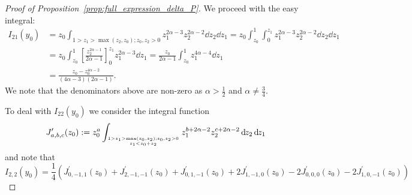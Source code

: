 \begin{proof}[Proof of Proposition~\ref{prop:full_expression_delta_P}]
We proceed with the easy integral:
\begin{align*}
	I_{21}(y_0) &= z_0 \int_{1>z_1>\max(z_2,z_0);z_0,z_2>0} z_1^{2\alpha-3} z_2^{2\alpha-2} {\dd}z_2{\dd}z_1   
		= z_0 \int_{z_0}^1 \int_{0}^{z_1} z_1^{2\alpha-3} z_2^{2\alpha-2} {\dd}z_2{\dd}z_1\\
	&= z_0 \int_{z_0}^1 \left[ \frac{z_2^{2\alpha-1}}{2\alpha-1}\right]_{0}^{z_1} z_1^{2\alpha-3} {\dd}z_1 
		= \frac{z_0}{2\alpha-1}  \int_{z_0}^1 z_1^{4\alpha-4} {\dd}z_1 \\
	&= \frac{z_0 - z_0^{4\alpha-2}}{(4\alpha-3)(2\alpha-1)}.
\end{align*}
We note that the denominators above are non-zero as $\alpha > \frac{1}{2}$ and $\alpha \not =\frac{3}{4}$.

To deal with $I_{22}(y_0)$ we consider the integral function
\[
	J_{a,b,c}^\prime(z_0) := z_0^a \int_{{1>z_1>\max(z_0,z_2); z_0,z_2>0}\atop{z_1 < z_0+z_2}} z_1^{b+2\alpha-2} z_2^{c+2\alpha-2} {\operatorname{\, \mathrm{d}\hspace{-1pt}}}z_2{\operatorname{\, \mathrm{d}\hspace{-1pt}}}z_1
\]
and note that
\begin{equation}\label{eq:Delta_P_computation_I22_J}
	I_{2,2}(y_0) = \frac{1}{4}\left(J_{0,-1,1}^\prime(z_0) + J_{2,-1,-1}^\prime(z_0)
	+ J_{0,1,-1}^\prime(z_0) + 2J_{1,-1,0}^\prime(z_0) - 2J_{0,0,0}^\prime(z_0) - 2J_{1,0,-1}^\prime(z_0)\right)
\end{equation}


\end{proof}
